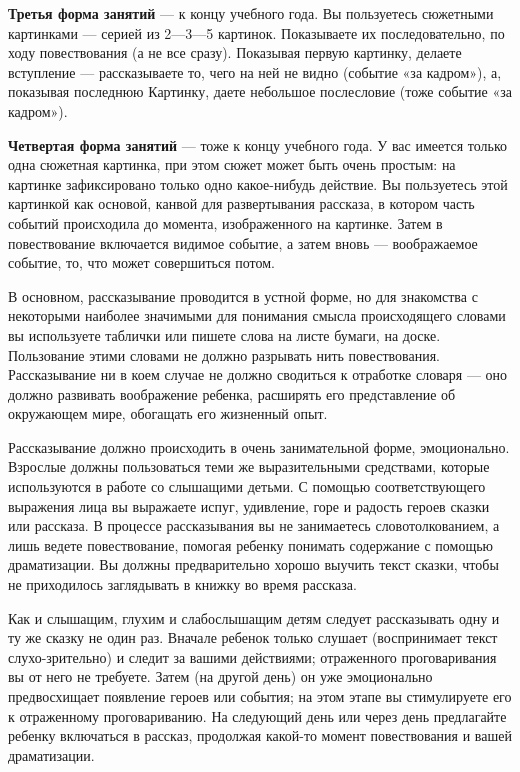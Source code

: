 \documentclass[a5paper]{book}
\begin{document}
\textbf{Третья форма занятий} --- к концу учебного года. Вы пользуетесь
сюжетными картинками --- серией из 2---3---5 картинок. Показываете их
последовательно, по ходу повествования (а не все сразу). Показывая
первую картинку, делаете вступление --- рассказываете то, чего на ней не
видно (событие «за кадром»), а, показывая последнюю Картинку, даете
небольшое послесловие (тоже событие «за кадром»).

\textbf{Четвертая форма занятий} --- тоже к концу учебного года. У вас
имеется только одна сюжетная картинка, при этом сюжет может быть очень
простым: на картинке зафиксировано только одно какое-нибудь действие. Вы
пользуетесь этой картинкой как основой\textsc{,} канвой для
развертывания рассказа, в котором часть событий происходила до момента,
изображенного на картинке. Затем в повествование включается видимое
событие, а затем вновь --- воображаемое событие, то, что может
совершиться потом.

В основном, рассказывание проводится в устной форме, но для знакомства с
некоторыми наиболее значимыми для понимания смысла происходящего словами
вы используете таблички или пишете слова на листе бумаги, на доске.
Пользование этими словами не должно разрывать нить повествования.
Рассказывание ни в коем случае не должно сводиться к отработке словаря
--- оно должно развивать воображение ребенка, расширять его
представление об окружающем мире, обогащать его жизненный опыт.

Рассказывание должно происходить в очень занимательной форме,
эмоционально. Взрослые должны пользоваться теми же выразительными
средствами, которые используются в работе со слышащими детьми. С помощью
соответствующего выражения лица вы выражаете испуг, удивление, горе и
радость героев сказки или рассказа. В процессе рассказывания вы не
занимаетесь словотолкованием, а лишь ведете повествование, помогая
ребенку понимать содержание с помощью драматизации. Вы должны
предварительно хорошо выучить текст сказки, чтобы не приходилось
заглядывать в книжку во время рассказа.

Как и слышащим, глухим и слабослышащим детям следует рассказывать одну и
ту же сказку не один раз. Вначале ребенок только слушает (воспринимает
текст слухо-зрительно) и следит за вашими действиями; отраженного
проговаривания вы от него не требуете. Затем (на другой день) он уже
эмоционально предвосхищает появление героев или события; на этом этапе
вы стимулируете его к отраженному проговариванию. На следующий день или
через день предлагайте ребенку включаться в рассказ, продолжая какой-то
момент повествования и вашей драматизации.
\end{document}
